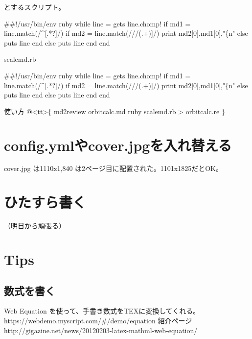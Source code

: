 とするスクリプト。

\begin{reviewemlist}
\#\#!/usr/bin/env ruby
while line = gets
  line.chomp!
  if md1 = line.match(/\textasciicircum{}\reviewbackslash{}[.*?\reviewbackslash{}]/)
    if md2 = line.match(/\reviewbackslash{}/\reviewbackslash{}/(.+)\reviewbackslash{}]/)
      print md2[0],md1[0],"\{\reviewbackslash{}n"
    else
      puts line
    end
  else
    puts line
  end
end

\end{reviewemlist}

scalemd.rb

\begin{reviewemlist}
\#\#!/usr/bin/env ruby
while line = gets
  line.chomp!
  if md1 = line.match(/\textasciicircum{}\reviewbackslash{}[.*?\reviewbackslash{}]/)
    if md2 = line.match(/\reviewbackslash{}/\reviewbackslash{}/(.+)\reviewbackslash{}]/)
      print md2[0],md1[0],"\{\reviewbackslash{}n"
    else
      puts line
    end
  else
    puts line
  end
end

\end{reviewemlist}

使い方
@\textless{}tt\textgreater{}\{
md2review orbitcalc.md \textbar{} ruby scalemd.rb \textgreater{} orbitcalc.re
\}

\section{config.ymlやcover.jpgを入れ替える}
\label{sec:4-6}

cover.jpg は1110x1,840 は2ページ目に配置された。1101x1825だとOK。

\section{ひたすら書く}
\label{sec:4-7}

（明日から頑張る）

\section{Tips}
\label{sec:4-8}

\subsection*{数式を書く}
\label{sec:4-8-1}

Web Equation
を使って、手書き数式をTEXに変換してくれる。
https://webdemo.myscript.com/\#/demo/equation
紹介ページ
http://gigazine.net/news/20120203{-}latex{-}mathml{-}web{-}equation/


